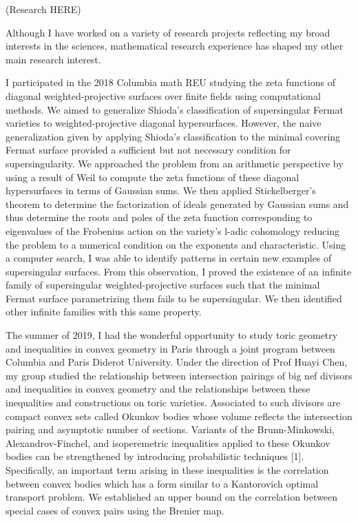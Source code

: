 \documentclass[10pt]{amsart}
\begin{document}
(Research HERE)

Although I have worked on a variety of research projects reflecting my broad interests in the sciences, mathematical research experience has shaped my other main research interest.

I participated in the 2018 Columbia math REU studying the zeta functions of diagonal weighted-projective surfaces over finite fields using computational methods. We aimed to generalize Shioda’s classification of supersingular Fermat varieties to weighted-projective diagonal hypersurfaces. However, the naive generalization given by applying Shioda’s classification to the minimal covering Fermat surface provided a sufficient but not necessary condition for supersingularity. We approached the problem from an arithmetic perspective by using a result of Weil to compute the zeta functions of these diagonal hypersurfaces in terms of Gaussian sums. We then applied Stickelberger's theorem to determine the factorization of ideals generated by Gaussian sums and thus determine the roots and poles of the zeta function corresponding to eigenvalues of the Frobenius action on the variety’s l-adic cohomology reducing the problem to a numerical condition on the exponents and characteristic. Using a computer search, I was able to identify patterns in certain new examples of supersingular surfaces. From this observation, I proved the existence of an infinite family of supersingular weighted-projective surfaces such that the minimal Fermat surface parametrizing them fails to be supersingular. We then identified other infinite families with this same property.  
\par
The summer of 2019, I had the wonderful opportunity to study toric geometry and inequalities in convex geometry in Paris through a joint program between Columbia and Paris Diderot University. Under the direction of Prof Huayi Chen, my group studied the relationship between intersection pairings of big nef divisors and inequalities in convex geometry and the relationships between these inequalities and constructions on toric varieties. Associated to such divisors are compact convex sets called Okunkov bodies whose volume reflects the intersection pairing and asymptotic number of sections. Variants of the Brunn-Minkowski, Alexandrov-Finchel, and isoperemetric inequalities applied to these Okunkov bodies can be strengthened by introducing probabilistic techniques [1]. Specifically, an important term arising in these inequalities is the correlation between convex bodies which has a form similar to a Kantorovich optimal transport problem. We established an upper bound on the correlation between special cases of convex pairs using the Brenier map.  
\end{document}
